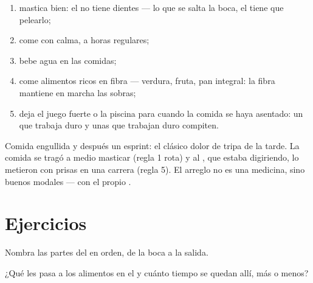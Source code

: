 \begin{method}\label{met:g4:journey-of-food:habits}
\begin{enumerate}
  \item mastica bien: el  no tiene dientes --- lo que se salta
        la boca, el  tiene que pelearlo;
  \item come con calma, a horas regulares;
  \item bebe agua en las comidas;
  \item come alimentos ricos en fibra --- verdura, fruta, pan integral:
        la fibra mantiene en marcha las sobras;
  \item deja el juego fuerte o la piscina para cuando la comida se haya
        asentado: un  que trabaja duro y unas  que
        trabajan duro compiten.
\end{enumerate}
\end{method}

\begin{example}\label{ex:g4:journey-of-food:ache}
Comida engullida y después un esprint: el clásico dolor de tripa de la
tarde. La comida se tragó a medio masticar (regla 1 rota) y al
, que estaba digiriendo, lo metieron con prisas en una carrera
(regla 5). El arreglo no es una medicina, sino buenos modales --- con
el propio .
\end{example}

\section{Ejercicios}

\begin{exercise}[$\star$]\label{exo:g4:journey-of-food:1}
Nombra las partes del  en orden, de la boca a la salida.
\end{exercise}

\begin{exercise}[$\star$]\label{exo:g4:journey-of-food:2}
¿Qué les pasa a los alimentos en el  y cuánto tiempo se quedan
allí, más o menos?
\end{exercise}

